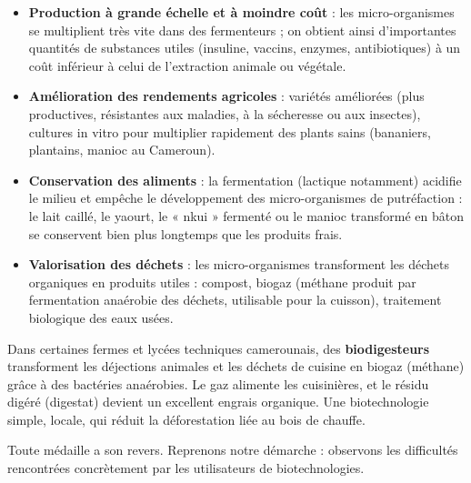 \documentclass[11pt]{article}
\newcommand{\cle}[1]{{\popxbold\color{popdark}#1}}
\newcounter{popsec}
\newcounter{popsub}
\newcommand{\courssub}[1]{%
  \stepcounter{popsub}%
  \par\vspace{9pt}\noindent{\popxbold\fontsize{11.5}{13}\selectfont\color{popink}{\color{poporange}\thepopsec.\thepopsub}\hspace{6pt}#1}\par\nopagebreak\vspace{4pt}
}
\begin{document}
\begin{aretenir}
\begin{itemize}
\item \textbf{Production à grande échelle et à moindre coût} : les micro-organismes se multiplient très vite dans des fermenteurs ; on obtient ainsi d'importantes quantités de substances utiles (insuline, vaccins, enzymes, antibiotiques) à un coût inférieur à celui de l'extraction animale ou végétale.
\item \textbf{Amélioration des rendements agricoles} : variétés améliorées (plus productives, résistantes aux maladies, à la sécheresse ou aux insectes), cultures in vitro pour multiplier rapidement des plants sains (bananiers, plantains, manioc au Cameroun).
\item \textbf{Conservation des aliments} : la fermentation (lactique notamment) acidifie le milieu et empêche le développement des micro-organismes de putréfaction : le lait caillé, le yaourt, le « nkui » fermenté ou le manioc transformé en bâton se conservent bien plus longtemps que les produits frais.
\item \textbf{Valorisation des déchets} : les micro-organismes transforment les déchets organiques en produits utiles : compost, biogaz (méthane produit par fermentation anaérobie des déchets, utilisable pour la cuisson), traitement biologique des eaux usées.
\end{itemize}
\end{aretenir}

\begin{savaistu}
Dans certaines fermes et lycées techniques camerounais, des \textbf{biodigesteurs} transforment les déjections animales et les déchets de cuisine en \cle{biogaz} (méthane) grâce à des bactéries anaérobies. Le gaz alimente les cuisinières, et le résidu digéré (digestat) devient un excellent engrais organique. Une biotechnologie simple, locale, qui réduit la déforestation liée au bois de chauffe.
\end{savaistu}

\courssub{Les limites techniques}

Toute médaille a son revers. Reprenons notre démarche : observons les difficultés rencontrées concrètement par les utilisateurs de biotechnologies.
\end{document}
